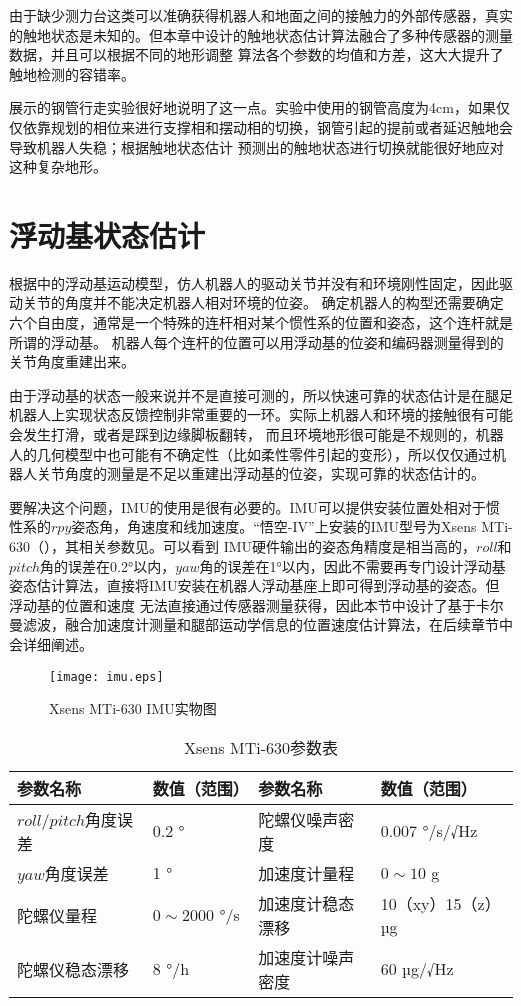 由于缺少测力台这类可以准确获得机器人和地面之间的接触力的外部传感器，真实的触地状态是未知的。但本章中设计的触地状态估计算法融合了多种传感器的测量数据，并且可以根据不同的地形调整
算法各个参数的均值和方差，这大大提升了触地检测的容错率。

\aref{}展示的钢管行走实验很好地说明了这一点。实验中使用的钢管高度为4cm，如果仅仅依靠规划的相位来进行支撑相和摆动相的切换，钢管引起的提前或者延迟触地会导致机器人失稳；根据触地状态估计
预测出的触地状态进行切换就能很好地应对这种复杂地形。

\section{浮动基状态估计}
\label{sec:com_est}
根据中的浮动基运动模型，仿人机器人的驱动关节并没有和环境刚性固定，因此驱动关节的角度并不能决定机器人相对环境的位姿。
确定机器人的构型还需要确定六个自由度，通常是一个特殊的连杆相对某个惯性系的位置和姿态，这个连杆就是所谓的浮动基。
机器人每个连杆的位置可以用浮动基的位姿和编码器测量得到的关节角度重建出来。

由于浮动基的状态一般来说并不是直接可测的，所以快速可靠的状态估计是在腿足机器人上实现状态反馈控制非常重要的一环。实际上机器人和环境的接触很有可能会发生打滑，或者是踩到边缘脚板翻转，
而且环境地形很可能是不规则的，机器人的几何模型中也可能有不确定性（比如柔性零件引起的变形），所以仅仅通过机器人关节角度的测量是不足以重建出浮动基的位姿，实现可靠的状态估计的。

要解决这个问题，IMU的使用是很有必要的。IMU可以提供安装位置处相对于惯性系的$rpy$姿态角，角速度和线加速度。“悟空-IV”上安装的IMU型号为Xsens MTi-630（），其相关参数见。可以看到
IMU硬件输出的姿态角精度是相当高的，$roll$和$pitch$角的误差在0.2°以内，$yaw$角的误差在1°以内，因此不需要再专门设计浮动基姿态估计算法，直接将IMU安装在机器人浮动基座上即可得到浮动基的姿态。但浮动基的位置和速度
无法直接通过传感器测量获得，因此本节中设计了基于卡尔曼滤波，融合加速度计测量和腿部运动学信息的位置速度估计算法，在后续章节中会详细阐述。
\begin{figure}[htbp]
    \centering
    \texttt{[image: imu.eps]}
    \caption{\label{fig:imu}Xsens MTi-630 IMU实物图}
\end{figure}
\begin{table}[htbp]
	\centering
	\caption{Xsens MTi-630参数表}
	\label{tab:imu_data}
	\begin{tabular}{m{4cm}<{\centering}m{2.5cm}<{\centering}m{4cm}<{\centering}m{4cm}<{\centering}}
		\toprule  %
		参数名称   &数值（范围） & 参数名称 &数值（范围）  \\
		\midrule  %
		$roll/pitch$角度误差    & 0.2 ° & 陀螺仪噪声密度 & 0.007 °/s/√Hz \\
		$yaw$角度误差 &  1 ° & 加速度计量程 & $0\sim10$ g\\
		陀螺仪量程 & $0\sim2000$ °/s & 加速度计稳态漂移 & 10（xy）15（z） µg \\
        陀螺仪稳态漂移 & 8 °/h & 加速度计噪声密度 & 60 µg/√Hz\\
		\bottomrule %
	\end{tabular}
\end{table}
